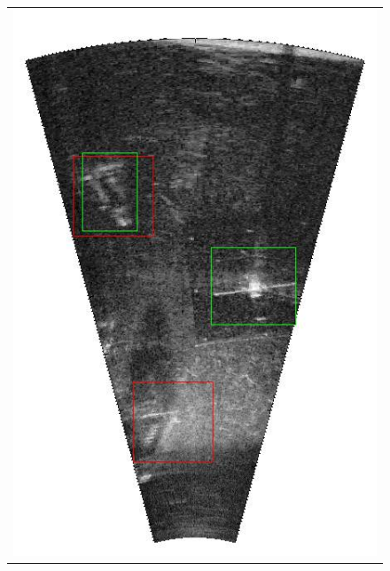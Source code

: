 \begin{figure}[!p]
{\begin{tabular}[b]{c}
		\includegraphics[height=0.22\textheight]{chapters/images/proposals/errors/2016-02-11_035335-frame11651-proposals.jpg}\\

\end{tabular}}
\end{figure}
